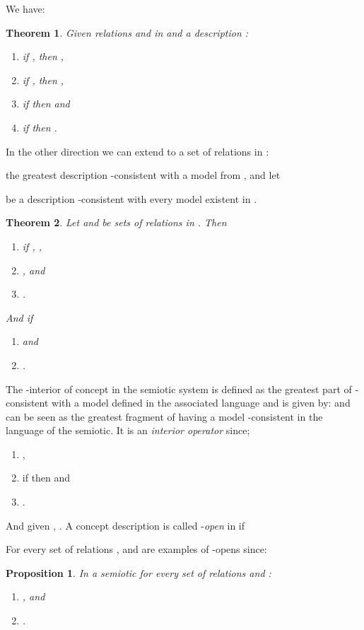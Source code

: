 \documentclass[oribibl]{llncs}
\newtheorem{thm}{Theorem}
\newtheorem{prop}{Proposition}
\begin{document}
We have:

\begin{thm}
Given relations  and  in  and a description
:
\begin{enumerate}
  \item if , then ,
  \item if , then ,
  \item if  then  and
  \item if  then .
\end{enumerate}
\end{thm}

In the other direction we can extend  to a set of
relations  in :

the greatest description -consistent with a model from ,
and let

be a description -consistent with every model existent in
.

\begin{thm}
Let  and  be sets of relations in . Then
\begin{enumerate}
  \item if , ,
  \item ,
  and
  \item .
\end{enumerate}
And if 
\begin{enumerate}
  \item  and
  \item .
\end{enumerate}
\end{thm}

The -interior of concept  in the semiotic system 
is defined as the greatest part of  -consistent with a
model defined in the associated language and is given by:
 and can be seen as the greatest fragment of
 having a model -consistent in the language of the
semiotic. It is an \emph{interior operator} since;
\begin{enumerate}
  \item ,
  \item if  then  and
  \item .
\end{enumerate}
And given , . A concept description  is called
-\emph{open} in  if

For every set of relations ,  and
 are examples of -opens since:

\begin{prop}
In a semiotic for every set of relations  and :
\begin{enumerate}
  \item , and
  \item .
\end{enumerate}
\end{prop}
\end{document}

